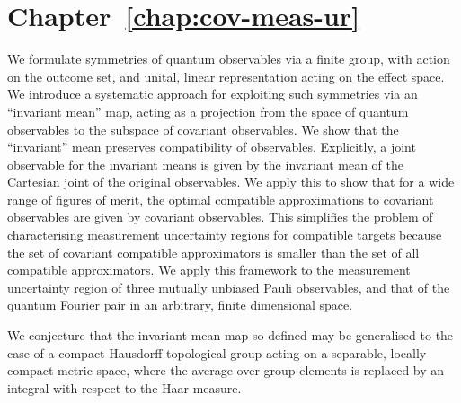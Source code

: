 \section*{Chapter~\ref{chap:cov-meas-ur}}

We formulate symmetries of quantum observables via a finite group, with action on the outcome set, and unital, linear representation acting on the effect space. We introduce a systematic approach for exploiting such symmetries via an ``invariant mean'' map, acting as a projection from the space of quantum observables to the subspace of covariant observables. We show that the ``invariant'' mean preserves compatibility of observables. Explicitly, a joint observable for the invariant means is given by the invariant mean of the Cartesian joint of the original observables. We apply this to show that for a wide range of figures of merit, the optimal compatible approximations to covariant observables are given by covariant observables. This simplifies the problem of characterising measurement uncertainty regions for compatible targets because the set of covariant compatible approximators is smaller than the set of all compatible approximators. We apply this framework to the measurement uncertainty region of three mutually unbiased Pauli observables, and that of the quantum Fourier pair in an arbitrary, finite dimensional space.

We conjecture that the invariant mean map so defined may be generalised to the case of a compact Hausdorff topological group acting on a separable, locally compact metric space, where the average over group elements is replaced by an integral with respect to the Haar measure.
